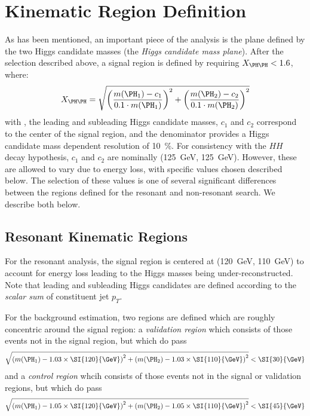 \FloatBarrier
\clearpage
\section{Kinematic Region Definition}
\label{sec:kinematic-reg}
As has been mentioned, an important piece of the analysis is the plane defined by the 
two Higgs candidate masses (the \emph{Higgs candidate mass plane}). After the selection
described above, a signal region is defined by requiring $X_{\higgs\higgs} < 1.6$, where:
\begin{equation}
	\label{eqn:xhh-def}
	X_{\higgs\higgs} = \sqrt{\qty(\frac{\mh1 - c_1}{0.1\cdot\mh1})^{2} + 
	\qty(\frac{\mh2 - c_2}{0.1\cdot\mh2})^{2}}
\end{equation}
with ,  the leading and subleading Higgs candidate masses, $c_{1}$ and $c_{2}$ correspond
to the center of the signal region, and the denominator provides a Higgs candidate mass 
dependent resolution of 10~\%. For consistency with the $HH$ decay hypothesis, $c_{1}$ and $c_{2}$
are nominally (\SI{125}{\GeV}, \SI{125}{\GeV}). However, these are allowed to vary due to 
energy loss, with specific values chosen described below. The selection of these values is 
one of several significant differences between the regions defined for the resonant and non-resonant search.
We describe both below.

\subsection{Resonant Kinematic Regions}
For the resonant analysis, the signal region is centered at (\SI{120}{\GeV}, \SI{110}{\GeV}) 
to account for energy loss leading to the Higgs masses being under-reconstructed.  Note that leading and subleading Higgs candidates are defined according to the 
\emph{scalar sum} of constituent jet $p_{T}$.

For the background estimation, two regions are defined which are roughly concentric around the 
signal region: a \emph{validation region} which 
consists of those events not in the signal region, but which do pass
\begin{equation}
	\label{eqn:val-reg-def}
	\sqrt{\qty(\mh1 - 1.03 \times \SI{120}{\GeV})^{2} + \qty(\mh2 - 1.03 \times
		\SI{110}{\GeV})^{2}} < \SI{30}{\GeV}
\end{equation}
and a \emph{control region} whcih consists of those events not in the signal or validation
regions, but which do pass
\begin{equation}
	\label{eqn:ctrl-reg-def}
	\sqrt{\qty(\mh1 - 1.05 \times \SI{120}{\GeV})^{2} + \qty(\mh2 - 1.05 \times
		\SI{110}{\GeV})^{2}} < \SI{45}{\GeV}
\end{equation}

